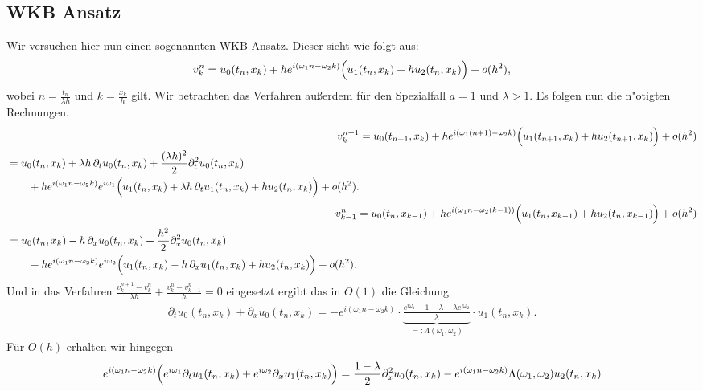 \subsection {WKB Ansatz}

Wir versuchen hier nun einen sogenannten WKB-Ansatz.
Dieser sieht wie folgt aus:
\begin{align}\label{eq:wkb:ansatz}
v^n_k = u_0(t_n, x_k) + h e^{i (\omega_1 n - \omega_2 k)} \Bigl( u_1(t_n, x_k) + h u_2(t_n, x_k) \Bigr) + o(h^2),
\end{align}
wobei $n = \frac {t_n}{\lambda h}$ und $k = \frac {x_k}{h}$ gilt.
Wir betrachten das Verfahren außerdem für den Spezialfall $a = 1$ und $\lambda > 1$.
Es folgen nun die n"otigten Rechnungen.
\begin{align}
v^{n+1}_k &= u_0(t_{n+1}, x_k) + h e^{i (\omega_1 (n+1) - \omega_2 k)} \Bigl( u_1(t_{n+1}, x_k) + h u_2(t_{n+1}, x_k) \Bigr) + o(h^2)\\
\begin{split}
&= u_0(t_n, x_k) + \lambda h \, \partial_t u_0(t_n, x_k) + \frac {(\lambda h)^2} 2 \partial^2_t u_0(t_n, x_k)\\
&\qquad + h e^{i (\omega_1 n - \omega_2 k)} e^{i \omega_1} \Bigl( u_1(t_n, x_k) + \lambda h \, \partial_t u_1(t_n, x_k) + h u_2(t_n, x_k) \Bigr) + o(h^2).
\end{split}
\end{align}
\begin{align}
v^n_{k-1} &= u_0(t_n, x_{k-1}) + h e^{i (\omega_1 n - \omega_2 (k-1))} \Bigl( u_1(t_n, x_{k-1}) + h u_2(t_n, x_{k-1}) \Bigr) + o(h^2)\\
\begin{split}
&= u_0(t_n, x_k) - h \, \partial_x u_0(t_n, x_k) + \frac {h^2} 2 \partial^2_x u_0(t_n, x_k)\\
&\qquad + h e^{i (\omega_1 n - \omega_2 k)} e^{i \omega_2} \Bigl( u_1(t_n, x_k) - h \, \partial_x u_1(t_n, x_k) + h u_2(t_n, x_k) \Bigr) + o(h^2).
\end{split}
\end{align}
Und in das Verfahren $\frac {v^{n+1}_k - v^n_k}{\lambda h} + \frac {v^n_k - v^n_{k-1}}{h} = 0$ eingesetzt ergibt das in $O(1)$ die Gleichung
\begin{align}
\partial_t u_0(t_n, x_k) + \partial_x u_0(t_n, x_k) = - e^{i (\omega_1 n - \omega_2 k)} \cdot \underbrace{\frac {e^{i \omega_1}  - 1 + \lambda - \lambda e^{i \omega_2}}{\lambda}}_{=: \Lambda(\omega_1, \omega_2)} \cdot u_1(t_n, x_k).
\end{align}
Für $O(h)$ erhalten wir hingegen
{\small
\begin{align}
e^{i (\omega_1 n - \omega_2 k)} \Bigl( e^{i \omega_1} \partial_t u_1(t_n, x_k) + e^{i \omega_2} \partial_x u_1(t_n, x_k) \Bigr) = \frac {1 - \lambda} 2 \partial^2_x u_0(t_n, x_k) - e^{i (\omega_1 n - \omega_2 k)} \Lambda(\omega_1, \omega_2) u_2(t_n, x_k)
 \end{align}
 }
